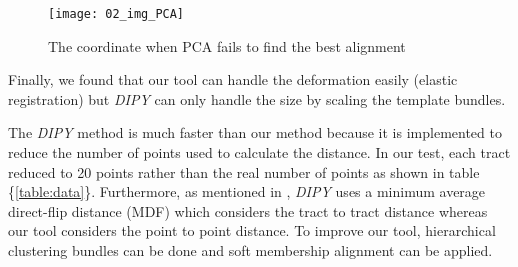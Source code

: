 \documentclass[../structure.tex]{subfiles}
\begin{document}
	\begin{figure}[h!]
	\centering
	\texttt{[image: 02\_img\_PCA]}
	\captionsetup{justification=centering}
	\caption{The coordinate when PCA fails to find the best alignment}
	\label{fig:all_brain}
	\end{figure}
\pagebreak

Finally, we found that our tool can handle the deformation easily (elastic registration) but \textit{DIPY} can only handle the size by scaling the template bundles.

The \textit{DIPY} method is much faster than our method because it is implemented to reduce the number of points used to calculate the distance. In our test, each tract reduced to 20 points rather than the real number of points as shown in table \{\ref{table:data}\}. Furthermore, as mentioned in \cite{ODonnell2012}, \textit{DIPY} uses a minimum average direct-flip distance (MDF) which considers the tract to tract distance whereas our tool considers the point to point distance. To improve our tool, hierarchical clustering bundles can be done and soft membership alignment can be applied.
\end{document}
